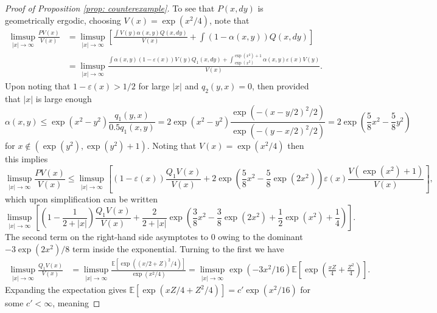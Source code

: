 \documentclass{article}
\theoremstyle{definition}
\theoremstyle{plain}
\begin{document}
\begin{proof}[Proof of Proposition \ref{prop: counterexample}]
To see that $P(x,dy)$ is geometrically ergodic, choosing $V(x) = \exp(x^2/4) $, note that
\begin{align*}
\limsup_{|x|\to\infty} \frac{PV(x)}{V(x)} & =\limsup_{|x|\to\infty}\left[\frac{\int V(y)\alpha(x,y)Q(x,dy) }{V(x)}+ \int(1-\alpha(x,y)) Q(x,dy) \right]\\
 &= \limsup_{|x|\to\infty}\frac{\int\alpha(x,y)(1-\varepsilon(x))V(y)Q_1(x,dy)  + \int_{\exp(x^2)}^{\exp(x^2)+1}\alpha(x,y)\varepsilon(x) V(y)}{V(x)}.
\end{align*}
Upon noting that $1-\varepsilon(x) > 1/2$ for large $|x|$ and $q_2(y,x) = 0$, then provided that $|x|$ is large enough
\begin{equation*}
    \alpha(x,y) \le \exp(x^2-y^2)\frac{q_1(y,x)}{0.5q_1(x,y)} = 2\exp(x^2-y^2) \frac{\exp\left(-(x-y/2)^2/2\right) }{\exp\left(-(y-x/2)^2/2\right)} = 2\exp\left(\frac{5}{8}x^2-\frac{5}{8}y^2\right)
\end{equation*}
for $x\notin (\exp(y^2),\exp(y^2)+1)$.  Noting that $V(x) = \exp(x^2/4)$ then this implies
\begin{equation*}
    \limsup_{|x|\to\infty} \frac{PV(x)}{V(x)}
    \le 
    \limsup_{|x|\to \infty}\left[(1-\varepsilon(x))\frac{Q_1V(x)}{V(x)} + 2\exp\left(\frac{5}{8}x^2-\frac{5}{8}\exp(2x^2)\right)\varepsilon(x)\frac{V(\exp(x^2)+1)}{V(x)}\right],
\end{equation*}
which upon simplification can be written
\begin{equation}
\label{eq:pv_expression}
    \limsup_{|x|\to\infty}\left[\left(1-\frac{1}{2+|x|}\right)\frac{Q_1V(x)}{V(x)} + \frac{2}{2+|x|} \exp\left(\frac{3}{8}x^2 - \frac{3}{8}\exp(2x^2)+\frac{1}{2}\exp(x^2)+\frac{1}{4}\right)\right].
\end{equation}
The second term on the right-hand side asymptotes to $0$ owing to the dominant $- 3\exp(2x^2)/8$ term inside the exponential.  Turning to the first we have
\begin{align*}
    \limsup_{|x|\to\infty}\frac{Q_1V(x)}{V(x)} 
    &= 
    \limsup_{|x|\to\infty}\frac{\mathbb{E}[\exp((x/2+Z)^2/4)]}{\exp(x^2/4)}
    = \limsup_{|x|\to\infty}\exp(-3x^2/16)\mathbb{E}\left[\exp\left(\frac{xZ}{4}+\frac{Z^2}{4}\right)\right].
\end{align*}
Expanding the expectation gives $\mathbb{E}\left[\exp\left(xZ/4+Z^2/4\right)\right] = c'\exp\left(x^2/16\right)$ for some $c'<\infty$, meaning

\end{proof}
\end{document}
